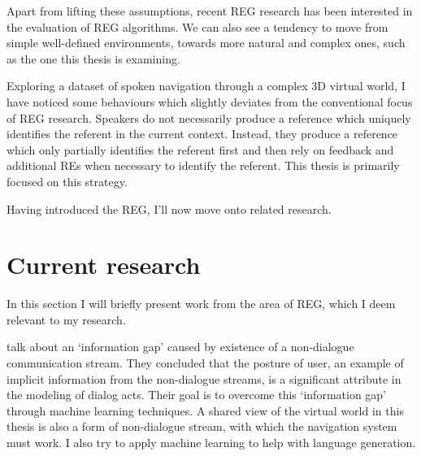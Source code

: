 Apart from lifting these assumptions, recent REG research has been interested in the evaluation of REG algorithms. We can also see a tendency to move from simple well-defined environments, towards more natural and complex ones, such as the one this thesis is examining.

Exploring a dataset of spoken navigation through a complex 3D virtual world, I have noticed some behaviours which slightly deviates from the conventional focus of REG research. Speakers do not necessarily produce a reference which uniquely identifies the referent in the current context. Instead, they produce a reference which only partially identifies the referent first and then rely on feedback and additional REs when necessary to identify the referent. This thesis is primarily focused on this strategy.

Having introduced the REG, I'll now move onto related research.

\section{Current research}
\label{sec:relwork}
In this section I will briefly present work from the area of REG, which I deem relevant to my research.

\citet{ha2012combining} talk about an `information gap' caused by existence of a non-dialogue communication stream. They concluded that the posture of user, an example of implicit information from the non-dialogue streams, is a significant attribute in the modeling of dialog acts. Their goal is to overcome this `information gap' through machine learning techniques. A shared view of the virtual world in this thesis is also a form of non-dialogue stream, with which the navigation system must work. I also try to apply machine learning to help with language generation.


